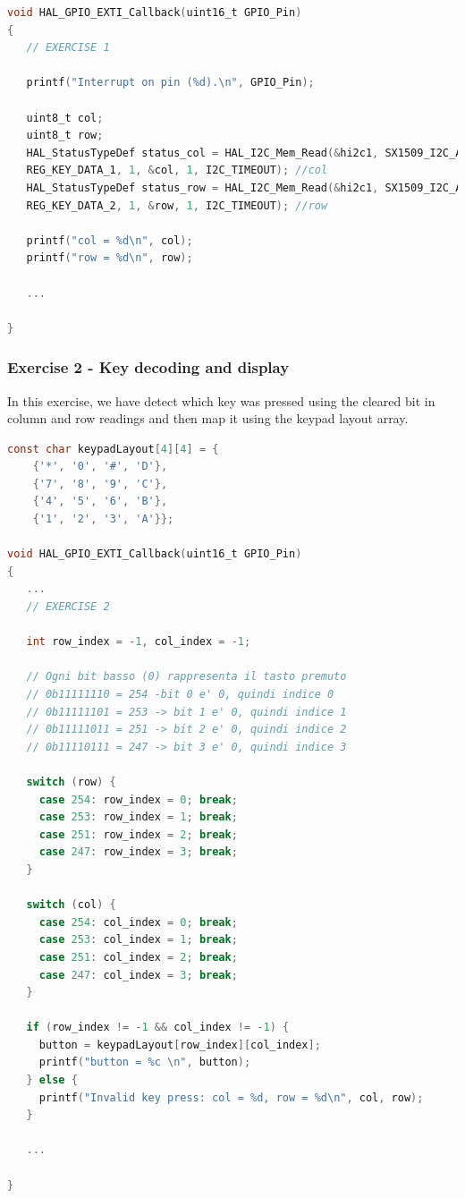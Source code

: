 \begin{lstlisting}[language=C]
void HAL_GPIO_EXTI_Callback(uint16_t GPIO_Pin)
{
   // EXERCISE 1

   printf("Interrupt on pin (%d).\n", GPIO_Pin);

   uint8_t col;
   uint8_t row;
   HAL_StatusTypeDef status_col = HAL_I2C_Mem_Read(&hi2c1, SX1509_I2C_ADDR2 << 1, 
   REG_KEY_DATA_1, 1, &col, 1, I2C_TIMEOUT); //col
   HAL_StatusTypeDef status_row = HAL_I2C_Mem_Read(&hi2c1, SX1509_I2C_ADDR2 << 1, 
   REG_KEY_DATA_2, 1, &row, 1, I2C_TIMEOUT); //row

   printf("col = %d\n", col);
   printf("row = %d\n", row);

   ...

}
\end{lstlisting}

\subsubsection{Exercise 2 - Key decoding and display}

In this exercise, we have detect which key was pressed using the cleared bit in column and row readings and then map it using the keypad layout array.

\bigskip

\begin{lstlisting}[language=C]
const char keypadLayout[4][4] = {
    {'*', '0', '#', 'D'},
    {'7', '8', '9', 'C'},
    {'4', '5', '6', 'B'},
    {'1', '2', '3', 'A'}};

void HAL_GPIO_EXTI_Callback(uint16_t GPIO_Pin)
{
   ...
   // EXERCISE 2

   int row_index = -1, col_index = -1;

   // Ogni bit basso (0) rappresenta il tasto premuto
   // 0b11111110 = 254 -bit 0 e' 0, quindi indice 0
   // 0b11111101 = 253 -> bit 1 e' 0, quindi indice 1
   // 0b11111011 = 251 -> bit 2 e' 0, quindi indice 2
   // 0b11110111 = 247 -> bit 3 e' 0, quindi indice 3

   switch (row) {
     case 254: row_index = 0; break;
     case 253: row_index = 1; break;
     case 251: row_index = 2; break;
     case 247: row_index = 3; break;
   }

   switch (col) {
     case 254: col_index = 0; break;
     case 253: col_index = 1; break;
     case 251: col_index = 2; break;
     case 247: col_index = 3; break;
   }

   if (row_index != -1 && col_index != -1) {
     button = keypadLayout[row_index][col_index];
     printf("button = %c \n", button);
   } else {
     printf("Invalid key press: col = %d, row = %d\n", col, row);
   }
   
   ...

}

\end{lstlisting}


